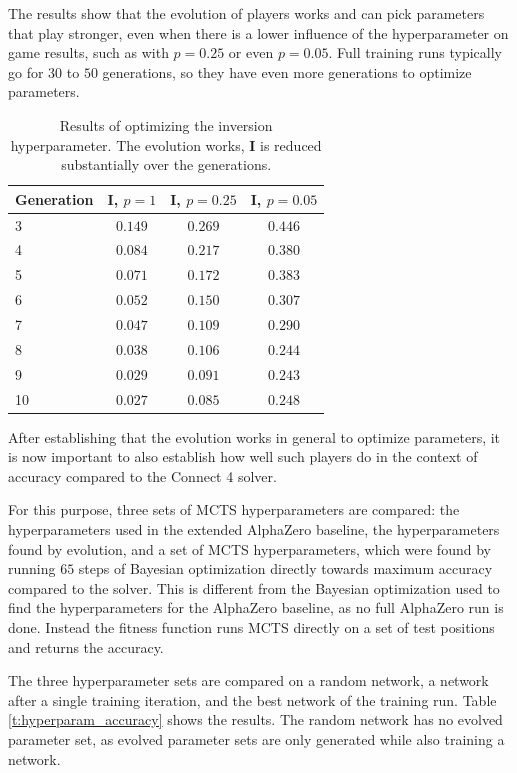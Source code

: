 \documentclass[12pt,onecolumn,oneside,titlepage]{article}
\begin{document}
The results show that the evolution of players works and can pick parameters that play stronger, even when there is a lower influence of the hyperparameter on game results, such as with $p = 0.25$ or even $p = 0.05$.
Full training runs typically go for $30$ to $50$ generations, so they have even more generations to optimize parameters.

\begin{table} [H]
 \centering
  \begin{tabular}{ l | c c c }
  Generation & $\mathbf{I}$, $p = 1$ & $\mathbf{I}$, $p = 0.25$ & $\mathbf{I}$, $p = 0.05$ \\
  \hline
  3 & $0.149$ & $0.269$ & $0.446$ \\
  4 & $0.084$ & $0.217$ & $0.380$ \\
  5 & $0.071$ & $0.172$ & $0.383$ \\
  6 & $0.052$ & $0.150$ & $0.307$ \\
  7 & $0.047$ & $0.109$ & $0.290$ \\
  8 & $0.038$ & $0.106$ & $0.244$ \\
  9 & $0.029$ & $0.091$ & $0.243$ \\
  10 & $0.027$ & $0.085$ & $0.248$ \\
  \end{tabular}
  \caption{Results of optimizing the inversion hyperparameter. The evolution works, $\mathbf{I}$ is reduced substantially over the generations.}
  \label{t:inversion_results}
\end{table}


After establishing that the evolution works in general to optimize parameters, it is now important to also establish how well such players do in the context of accuracy compared to the Connect 4 solver.

For this purpose, three sets of MCTS hyperparameters are compared: the hyperparameters used in the extended AlphaZero baseline, the hyperparameters found by evolution, and a set of 
MCTS hyperparameters, which were found by running $65$ steps of Bayesian optimization
directly towards maximum accuracy compared to the solver. This is different from the Bayesian optimization used 
to find the hyperparameters for the AlphaZero baseline, as no full AlphaZero run is done. Instead the fitness function runs MCTS directly on a set of test positions and returns
the accuracy.

The three hyperparameter sets are compared on a random network, a network after a single training 
iteration, and the best network of the training run. Table \ref{t:hyperparam_accuracy} shows the results. The random network has no evolved
parameter set, as evolved parameter sets are only generated while also training a network.
\end{document}
